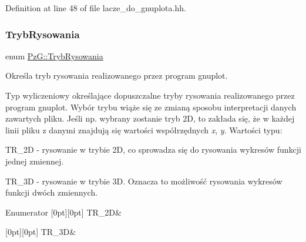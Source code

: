 Definition at line 48 of file lacze\+\_\+do\+\_\+gnuplota.\+hh.

\mbox{\label{namespace_pz_g_aeedae1ef10c66d720f9e89de408ca4ca}} 
\subsubsection{\texorpdfstring{Tryb\+Rysowania}{TrybRysowania}}
{\footnotesize\ttfamily enum \hyperlink{namespace_pz_g_aeedae1ef10c66d720f9e89de408ca4ca}{Pz\+G\+::\+Tryb\+Rysowania}}



Określa tryb rysowania realizowanego przez program {\ttfamily gnuplot}. 

Typ wyliczeniowy określające dopuszczalne tryby rysowania realizowanego przez program {\ttfamily gnuplot}. Wybór trybu wiąże się ze zmianą sposobu interpretacji danych zawartych pliku. Jeśli np. wybrany zostanie tryb 2D, to zakłada się, że w każdej linii pliku z danymi znajdują się wartości współrzędnych {\itshape x}, {\itshape y}. Wartości typu\+: \begin{DoxyItemize}
\item {\ttfamily T\+R\+\_\+2D} -\/ rysowanie w trybie 2D, co sprowadza się do rysowania wykresów funkcji jednej zmiennej. \item {\ttfamily T\+R\+\_\+3D} -\/ rysowanie w trybie 3D. Oznacza to możliwość rysowania wykresów funkcji dwóch zmiennych. \end{DoxyItemize}
\begin{DoxyEnumFields}{Enumerator}
[0pt][0pt]{}\mbox{\label{namespace_pz_g_aeedae1ef10c66d720f9e89de408ca4caa5eb0cf8b3405e136f092efdb489d60c4}} 
T\+R\+\_\+2D&\\
\hline

[0pt][0pt]{}\mbox{\label{namespace_pz_g_aeedae1ef10c66d720f9e89de408ca4caa856e6b0fa6b8a9dc184c60cf27dcc5d2}} 
T\+R\+\_\+3D&\\
\hline

\end{DoxyEnumFields}


